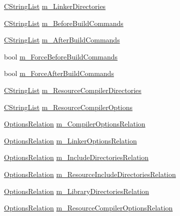 \begin{DoxyCompactItemize}
\item 
\hyperlink{classCStringList}{C\-String\-List} \hyperlink{classCBuildTarget_a8495121b03ecf4a7090ce3b712d0f13c}{m\-\_\-\-Linker\-Directories}
\item 
\hyperlink{classCStringList}{C\-String\-List} \hyperlink{classCBuildTarget_a388bfb990949692aa8744bb6923cf3fa}{m\-\_\-\-Before\-Build\-Commands}
\item 
\hyperlink{classCStringList}{C\-String\-List} \hyperlink{classCBuildTarget_a55cab6b25077cc64bfc7ac3487015407}{m\-\_\-\-After\-Build\-Commands}
\item 
bool \hyperlink{classCBuildTarget_a37ce43cd33d313194cd27aed4eaf1538}{m\-\_\-\-Force\-Before\-Build\-Commands}
\item 
bool \hyperlink{classCBuildTarget_a01e842edbeb72632cd2216a0957f8b93}{m\-\_\-\-Force\-After\-Build\-Commands}
\item 
\hyperlink{classCStringList}{C\-String\-List} \hyperlink{classCBuildTarget_aa2a1ff76b82d5b589e771bcda8a7c0d3}{m\-\_\-\-Resource\-Compiler\-Directories}
\item 
\hyperlink{classCStringList}{C\-String\-List} \hyperlink{classCBuildTarget_a6eb47859ebf84e5baa9410348df4c42c}{m\-\_\-\-Resource\-Compiler\-Options}
\item 
\hyperlink{classCBuildTarget_a65a8d160e9cb9cc5632373836e0adb9e}{Options\-Relation} \hyperlink{classCBuildTarget_a91e76527d772e1df848b78e5264774af}{m\-\_\-\-Compiler\-Options\-Relation}
\item 
\hyperlink{classCBuildTarget_a65a8d160e9cb9cc5632373836e0adb9e}{Options\-Relation} \hyperlink{classCBuildTarget_a88376156248b785211fa8ee8751b19e8}{m\-\_\-\-Linker\-Options\-Relation}
\item 
\hyperlink{classCBuildTarget_a65a8d160e9cb9cc5632373836e0adb9e}{Options\-Relation} \hyperlink{classCBuildTarget_a0e09642183809d9395d0573f8b1afd9d}{m\-\_\-\-Include\-Directories\-Relation}
\item 
\hyperlink{classCBuildTarget_a65a8d160e9cb9cc5632373836e0adb9e}{Options\-Relation} \hyperlink{classCBuildTarget_aaa250c58cf7203b795544a809773d230}{m\-\_\-\-Resource\-Include\-Directories\-Relation}
\item 
\hyperlink{classCBuildTarget_a65a8d160e9cb9cc5632373836e0adb9e}{Options\-Relation} \hyperlink{classCBuildTarget_a7febe49001f7362e21d170e918ced09f}{m\-\_\-\-Library\-Directories\-Relation}
\item 
\hyperlink{classCBuildTarget_a65a8d160e9cb9cc5632373836e0adb9e}{Options\-Relation} \hyperlink{classCBuildTarget_a6e41481ecb82a7ddc114be1e420fd960}{m\-\_\-\-Resource\-Compiler\-Options\-Relation}

\end{DoxyCompactItemize}
